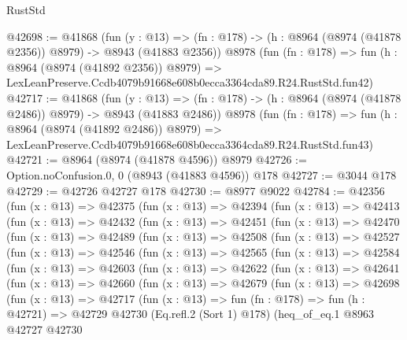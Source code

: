 \begin{lexlean}{RustStd}
\begin{coremodule}
@42698 := @41868
    (fun (y : @13) =>
    (fn : @178) -> (h : @8964 (@8974 (@41878 @2356)) @8979) -> @8943 (@41883 @2356))
    @8978
    (fun (fn : @178) =>
    fun (h : @8964 (@8974 (@41892 @2356)) @8979) =>
    LexLeanPreserve.Ccdb4079b91668e608b0ecca3364cda89.R24.RustStd.fun42)
@42717 := @41868
    (fun (y : @13) =>
    (fn : @178) -> (h : @8964 (@8974 (@41878 @2486)) @8979) -> @8943 (@41883 @2486))
    @8978
    (fun (fn : @178) =>
    fun (h : @8964 (@8974 (@41892 @2486)) @8979) =>
    LexLeanPreserve.Ccdb4079b91668e608b0ecca3364cda89.R24.RustStd.fun43)
@42721 := @8964 (@8974 (@41878 @4596)) @8979
@42726 := Option.noConfusion.{0, 0} (@8943 (@41883 @4596)) @178
@42727 := @3044 @178
@42729 := @42726 @42727 @178
@42730 := @8977 @9022
@42784 := @42356
    (fun (x : @13) =>
    @42375
      (fun (x : @13) =>
      @42394
        (fun (x : @13) =>
        @42413
          (fun (x : @13) =>
          @42432
            (fun (x : @13) =>
            @42451
              (fun (x : @13) =>
              @42470
                (fun (x : @13) =>
                @42489
                  (fun (x : @13) =>
                  @42508
                    (fun (x : @13) =>
                    @42527
                      (fun (x : @13) =>
                      @42546
                        (fun (x : @13) =>
                        @42565
                          (fun (x : @13) =>
                          @42584
                            (fun (x : @13) =>
                            @42603
                              (fun (x : @13) =>
                              @42622
                                (fun (x : @13) =>
                                @42641
                                  (fun (x : @13) =>
                                  @42660
                                    (fun (x : @13) =>
                                    @42679
                                      (fun (x : @13) =>
                                      @42698
                                        (fun (x : @13) =>
                                        @42717
                                          (fun (x : @13) =>
                                          fun (fn : @178) =>
                                          fun (h : @42721) =>
                                          @42729
                                            @42730
                                            (Eq.refl.{2} (Sort 1) @178)
                                            (heq_of_eq.{1}
                                              @8963
                                              @42727
                                              @42730

\end{coremodule}
\end{lexlean}
